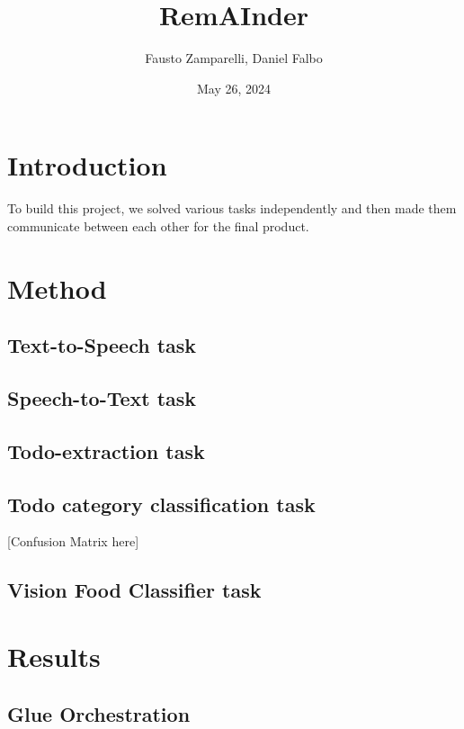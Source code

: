 \documentclass{article}
\title{RemAInder}
\author{Fausto Zamparelli, Daniel Falbo}
\date{May 26, 2024}
\begin{document}
\maketitle


\section*{Introduction}
To build this project, we solved various tasks independently and then made them communicate between each other for the final product.

\section*{Method}


\subsection*{Text-to-Speech task}

\subsection*{Speech-to-Text task}

\subsection*{Todo-extraction task}

\subsection*{Todo category classification task}

[Confusion Matrix here]

\subsection*{Vision Food Classifier task}


\section*{Results}

\subsection*{Glue Orchestration}
\end{document}
